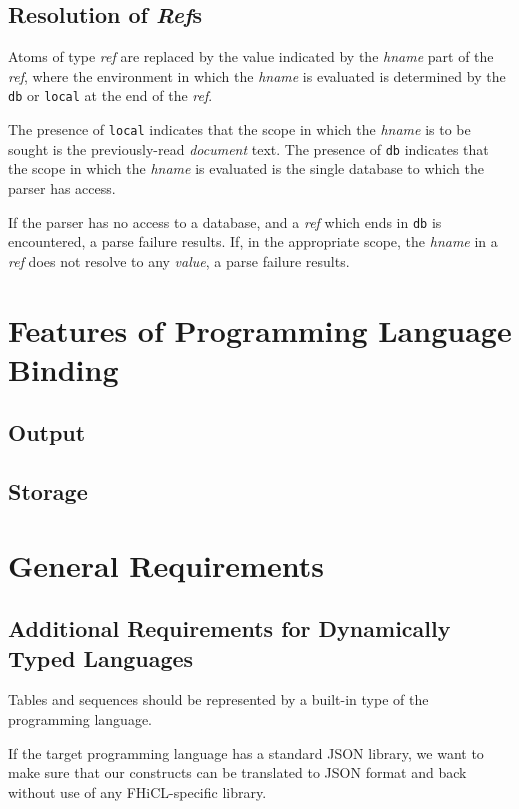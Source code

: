 \documentclass{article}
\begin{document}
	\subsection{Resolution of \emph{Ref}s\label{sec:refs}}
		Atoms of type \emph{ref} are replaced
		by the value indicated by the \emph{hname} part of the \emph{ref},
		where the environment in which the \emph{hname} is evaluated is determined
		by the \texttt{db} or \texttt{local} at the end of the \emph{ref}.
		\vspace{1mm}
		\par
		The presence of \texttt{local} indicates 
		that the scope in which the \emph{hname} is to be sought
		is the previously-read \emph{document} text.
		The presence of 
		\texttt{db} indicates
		that the scope in which the \emph{hname} is evaluated
		is the single database
		to which the parser has access.
		\vspace{1mm}
		\par
		If the parser has no access to a database,
		and a \emph{ref} which ends in \texttt{db} is encountered,
		a parse failure results.
		If,
		in the appropriate scope,
		the \emph{hname} in a \emph{ref} does not resolve to any \emph{value},
		a parse failure results.
		
\section{Features of Programming Language Binding}
	\subsection{Output}
	\subsection{Storage}	
		
\section{General Requirements}
	\subsection{Additional Requirements for Dynamically Typed Languages}
		Tables and sequences should be represented by a built-in type of the
		programming language.

		If the target programming language has a standard JSON library, we
		want to make sure that our constructs can be translated to JSON format
		and back without use of any FHiCL-specific library.
\end{document}
